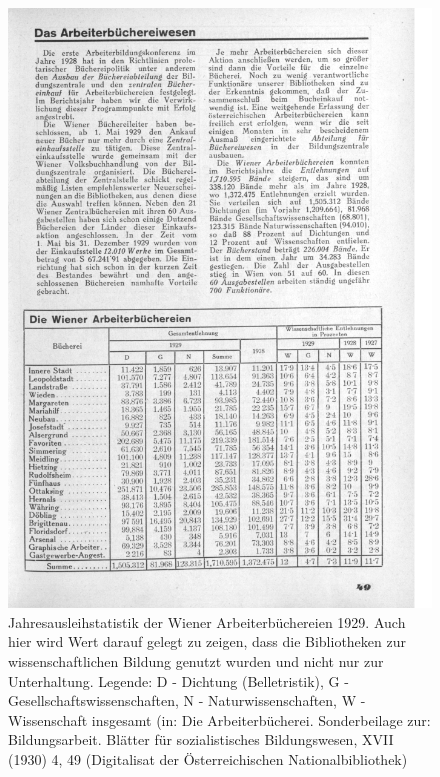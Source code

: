 \documentclass[a4paper,
fontsize=11pt,
oneside,
numbers=noperiodatend,
parskip=half-,
bibliography=totoc,
final
]{scrartcl}
\begin{document}
\begin{figure}
\centering
\includegraphics[width=14 cm]{img/Schuldt04.jpg}
\caption{Jahresausleihstatistik der Wiener Arbeiterbüchereien 1929. Auch
hier wird Wert darauf gelegt zu zeigen, dass die Bibliotheken zur
wissenschaftlichen Bildung genutzt wurden und nicht nur zur
Unterhaltung. Legende: D - Dichtung (Belletristik), G -
Gesellschaftswissenschaften, N - Naturwissenschaften, W - Wissenschaft
insgesamt (in: Die Arbeiterbücherei. Sonderbeilage zur: Bildungsarbeit.
Blätter für sozialistisches Bildungswesen, XVII (1930) 4, 49
(Digitalisat der Österreichischen Nationalbibliothek)}
\end{figure}
\end{document}
